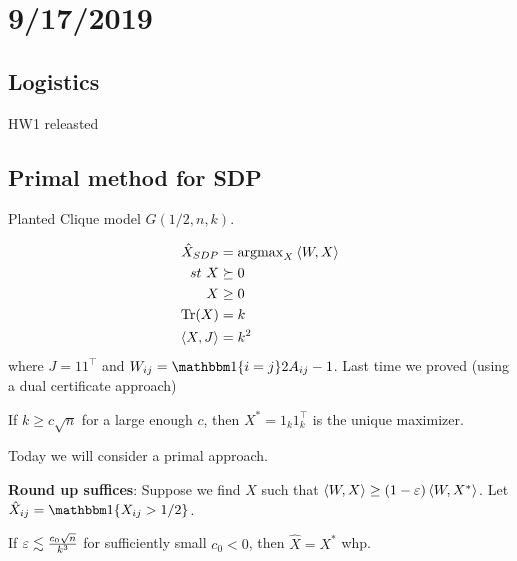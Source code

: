 \section{9/17/2019}

\subsection{Logistics}

HW1 releasted

\subsection{Primal method for SDP}

Planted Clique model $G(1/2, n, k)$.

\begin{align}
  \hat{X}_{SDP} &= \operatorname{argmax}_X \braket{W,X} \\
  st~X &\succeq 0 \\
  X &\geq 0 \\
  \operatorname{Tr}(X) &= k \\
  \braket{X, J} &= k^2
\end{align}
where $J = 1 1^\top$ and $W_{ij} = \ind\{i=j\} 2 A_{ij} - 1$.
Last time we proved (using a dual certificate approach)
\begin{theorem}
  If $k \geq c \sqrt{n}$ for a large enough $c$, then $X^* = 1_k 1_k^\top$
  is the unique maximizer.
\end{theorem}

Today we will consider a primal approach.

\textbf{Round up suffices}: Suppose we find $X$ such that
$\braket{W, X} \geq (1 - \varepsilon) \braket{W, X^*}$. Let
$\hat{X}_{ij} = \ind\{X_{ij} > 1/2\}$.

\begin{theorem}
  If $\varepsilon \lesssim \frac{c_0 \sqrt{n}}{k^3}$ for sufficiently small $c_0 < 0$,
  then $\hat{X} = X^*$ whp.
\end{theorem}

